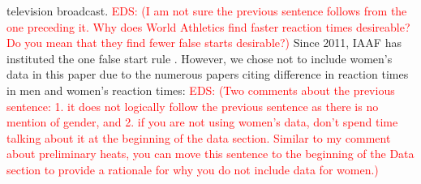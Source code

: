 \documentclass[12pt, letterpaper, titlepage]{article}
\newcommand{\eds}[1]{\textcolor{red}{EDS: (#1)}}
\begin{document}
television broadcast.  
\eds{I am not sure the previous sentence follows from the one preceding it. Why
 does World Athletics find faster reaction times desireable?  Do you mean that
they find fewer false starts desirable?}
Since 2011, IAAF has instituted the one false start rule
\citep{iaaf2009falsestart}. However, we chose not to include women's data in this
paper due to the numerous papers citing difference in reaction times in men and
women's reaction times: \citep{lipps2011implications, babicc2009reaction,
panoutsakopoulos2020gender}  \eds{Two comments about the previous sentence: 1. 
it does not logically follow the previous sentence as there is no mention of 
gender, and 2. if you are not using women's data, don't spend time talking about 
it at the beginning of the data section.  Similar to my comment about 
preliminary heats, you can move this sentence to the beginning of the Data 
section to provide a rationale for why you do not include data for women.} 
\end{document}
